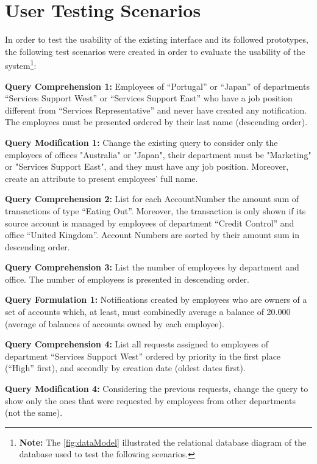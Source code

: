 \chapter{User Testing Scenarios}
\label{app:user_testing_scenarios}

In order to test the usability of the existing interface and its followed prototypes, the following test scenarios were created in order to evaluate the usability of the system\footnote{\textbf{Note: }The \ref{fig:dataModel} illustrated the relational database diagram of the database used to test the following scenarios.}:

\medskip

\textbf{Query Comprehension 1: }Employees of “Portugal” or “Japan” of departments “Services Support West” or “Services Support East” who have a job position different from “Services Representative” and never have created any notification. The employees must be presented ordered by their last name (descending order).

\medskip

\textbf{Query Modification 1: }Change the existing query to consider only the employees of offices "Australia" or "Japan", their department must be "Marketing" or "Services Support East", and they must have any job position. Moreover, create an attribute to present employees’ full name.

\medskip

\textbf{Query Comprehension 2: }List for each AccountNumber the amount sum of transactions of type “Eating Out”. Moreover, the transaction is only shown if its source account is managed by employees of department “Credit Control” and office “United Kingdom”. Account Numbers are sorted by their amount sum in descending order.

\medskip

\textbf{Query Comprehension 3: }List the number of employees by department and office. The number of employees is presented in descending order.

\medskip

\textbf{Query Formulation 1: }Notifications created by employees who are owners of a set of accounts which, at least, must combinedly average a balance of 20.000 (average of balances of accounts owned by each employee).

\medskip

\textbf{Query Comprehension 4: }List all requests assigned to employees of department “Services Support West” ordered by priority in the first place (“High” first), and secondly by creation date (oldest dates first).

\medskip

\textbf{Query Modification 4: }Considering the previous requests, change the query to show only the ones that were requested by employees from other departments (not the same).


